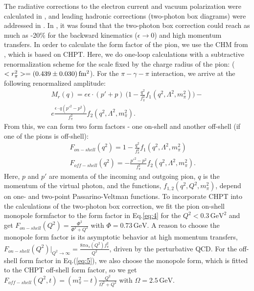 \documentclass[3p,times,twocolumn]{revtex4}
\begin{document}
The radiative corrections to the electron
current and vacuum polarization were calculated in \cite{AAB},
and leading hadronic corrections (two-photon box diagrams) were addressed in \cite{AAB2}. In \cite{AAB2}, it was found that the two-photon box
correction could
reach as much as -20\% for the backward kinematics
($\epsilon\rightarrow0$) and high momentum transfers. 
In order to calculate the form factor of the pion, we use the CHM from \cite{CHM}, which is based on
CHPT. Here, we do one-loop calculations
with a subtractive renormalization scheme for the scale
fixed by the charge radius of the pion: ($<r_{\pi}^{2}>=(0.439\pm0.030)\,\mbox{fm\ensuremath{^{2}}}$).
For the $\pi-\gamma-\pi$ interaction, we arrive at the following renormalized amplitude:
\begin{eqnarray}
M_{r}(q)=e\epsilon\cdot(p'+p) \ \bigg(1-\frac{q^{2}}{f_{\pi}^{2}}f_{1}(q^{2},\Lambda^{2},m_{\pi}^{2})\bigg)-
\nonumber \\
e\frac{\epsilon\cdot q(p'^{2}-p^{2})}{f_{\pi}^{2}}f_{2}(q^{2},\Lambda^{2},m_{\pi}^{2}).\label{eq:3}
\end{eqnarray}
From this, we can form two form factors - one on-shell and another off-shell (if one of the pions is off-shell): 
\begin{eqnarray}
&&F_{on-shell}(q^{2})=1-\frac{q^{2}}{f_{\pi}^{2}}f_{1}(q^{2},\Lambda^{2},m_{\pi}^{2})\label{eq:4}\\
&&F_{off-shell}(q^{2})=-\frac{p'^{2}-p^{2}}{f_{\pi}^{2}}f_{2}(q^{2},\Lambda^{2},m_{\pi}^{2}).\label{eq:5}
\end{eqnarray}
Here, $p$ and $p'$ are momenta of the incoming and outgoing pion, 
 $q$ is the momentum of the virtual photon, and the functions, $f_{1, 2}(q^{2},Q^{2},m_{\pi}^{2})$, 
depend on one- and two-point Passarino-Veltman functions. To incorporate CHPT
into the calculations of the two-photon box correction,
we fit the pion on-shell monopole formfactor to the form
factor in Eq.\ref{eq:4} for the $Q^{2}<0.3\,\mbox{GeV}^{2}$ and get $F_{on-shell}(Q^{2})=\frac{\Phi^{2}}{\Phi^{2}+Q^{2}}$
with $\Phi=0.73\,\mbox{GeV}$. A reason to choose the monopole form
factor is its asymptotic behavior at high momentum transfers, $F_{on-shell}(Q^{2})\bigg|_{Q^{2}\rightarrow\infty}=\frac{8\pi\alpha_{s}(Q^{2})f_{\pi}^{2}}{Q^{2}}$, driven by the perturbative QCD.
For the off-shell form factor in Eq.(\ref{eq:5}), we also choose the monopole
form, which is fitted to the CHPT off-shell form factor, so
we get $F_{off-shell}(Q^{2},t)=(m_{\pi}^{2}-t)\frac{Q^{2}}{\Omega^{2}+Q^{2}}$
with $\Omega=2.5\,\mbox{GeV.}$
\end{document}
